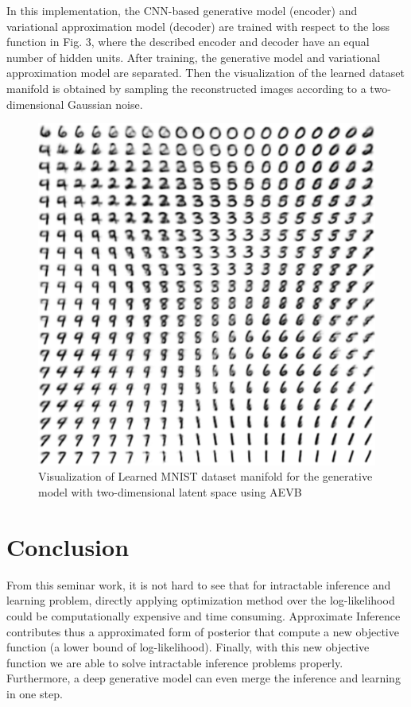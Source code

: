 \documentclass[conference]{IEEEtran}
\begin{document}
In this implementation, the CNN-based generative model (encoder) and variational approximation model (decoder) are trained with respect to the loss function in Fig. 3, where the described encoder and decoder have an equal number of hidden units. After training, the generative model and variational approximation model are separated. Then the visualization of the learned dataset manifold is obtained by sampling the reconstructed images according to a two-dimensional Gaussian noise.
\begin{figure}[ht]
  \centering
  \includegraphics[scale=0.25]{picture4.png}
     \caption{Visualization of Learned MNIST dataset manifold for the generative model with two-dimensional latent space using AEVB \cite{kingma2013auto}}\label{pic_4}
\end{figure}
\section{Conclusion}
From this seminar work, it is not hard to see that for intractable inference and learning problem, directly applying optimization method over the log-likelihood could be computationally expensive and time consuming. Approximate Inference contributes thus a approximated form of posterior that compute a new objective function (a lower bound of log-likelihood). Finally, with this new objective function we are able to solve intractable inference problems properly. Furthermore, a deep generative model can even merge the inference and learning in one step.
\end{document}
